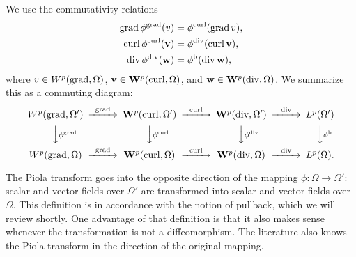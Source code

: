 \documentclass[10pt,letterpaper]{article}
\begin{document}
We use the commutativity relations 
\begin{subequations}\label{eq_piola_commute}
\begin{align}
    \operatorname{grad} \phi^{\operatorname{grad}} (v) &= \phi^{\operatorname{curl}}(\operatorname{grad} v), 
    \\
    \operatorname{curl} \phi^{\operatorname{curl}}({\mathbf v}) &= \phi^{\operatorname{div}}(\operatorname{curl} {\mathbf v}), 
    \\
    \operatorname{div} \phi^{\operatorname{div}}({\mathbf w}) &= \phi^{\rm b}(\operatorname{div} {\mathbf w}),
\end{align}
\end{subequations}
where $v \in W^{p}(\operatorname{grad},\Omega)$, ${\mathbf v} \in {\mathbf W}^{p}(\operatorname{curl},\Omega)$, and ${\mathbf w} \in {\mathbf W}^{p}(\operatorname{div},\Omega)$.  
We summarize this as a commuting diagram:
\begin{align*}
    \begin{CD}
        W^{p}(\grad,\Omega') @>{\grad}>> \bfW^{p}(\curl,\Omega') @>{\curl}>> \bfW^{p}(\divergence,\Omega') @>{\divergence}>> L^{p}(\Omega')
        \\
        @VV{\phi^{\grad}}V 
        @VV{\phi^{\curl}}V 
        @VV{\phi^{\divergence}}V 
        @VV{\phi^{\rm b}}V 
        \\
        W^{p}(\grad,\Omega ) @>{\grad}>> \bfW^{p}(\curl,\Omega ) @>{\curl}>> \bfW^{p}(\divergence,\Omega ) @>{\divergence}>> L^{p}(\Omega ).
    \end{CD}
\end{align*}

\begin{remark}
    The Piola transform goes into the opposite direction of the mapping $\phi : \Omega \rightarrow \Omega'$:
    scalar and vector fields over $\Omega'$ are transformed into scalar and vector fields over $\Omega$.
    This definition is in accordance with the notion of pullback, which we will review shortly. 
    One advantage of that definition is that it also makes sense whenever the transformation is not a diffeomorphism. 
    The literature also knows the Piola transform in the direction of the original mapping. 
\end{remark}



%
%


\end{document}
